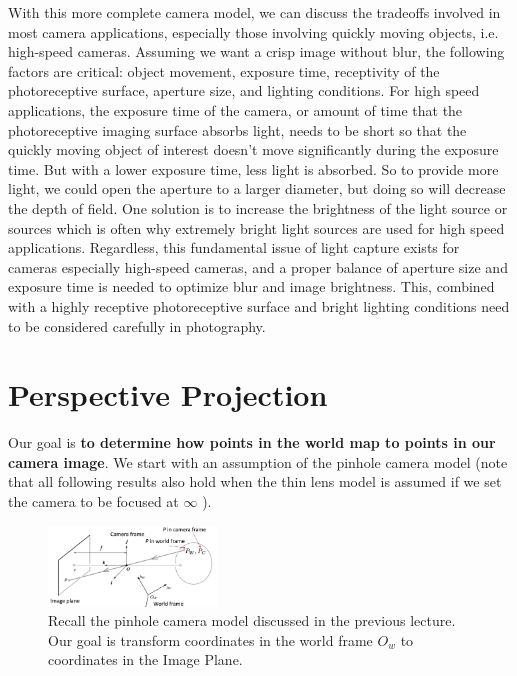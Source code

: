 \documentclass[]{article}
\begin{document}
	With this more complete camera model, we can discuss the tradeoffs involved in most camera applications, especially those involving quickly moving objects, i.e. high-speed cameras. Assuming we want a crisp image without blur, the following factors are critical: object movement, exposure time, receptivity of the photoreceptive surface, aperture size, and lighting conditions. For high speed applications, the exposure time of the camera, or amount of time that the photoreceptive imaging surface absorbs light, needs to be short so that the quickly moving object of interest doesn't move significantly during the exposure time. But with a lower exposure time, less light is absorbed. So to provide more light, we could open the aperture to a larger diameter, but doing so will decrease the depth of field. One solution is to increase the brightness of the light source or sources which is often why extremely bright light sources are used for high speed applications. Regardless, this fundamental issue of light capture exists for cameras especially high-speed cameras, and a proper balance of aperture size and exposure time is needed to optimize blur and image brightness. This, combined with a highly receptive photoreceptive surface and bright lighting conditions need to be considered carefully in photography.
	
	
	\section{Perspective Projection}
	Our goal is \textbf{to determine how points in the world map to points in our camera image}. We start with an assumption of the pinhole camera model (note that all following results also hold when the thin lens model is assumed if we set the camera to be focused at $\infty$ ).
	
	\begin{figure}[H]
		\includegraphics[width=0.4\textwidth]{diagram_1_vik.png}
		\centering
		\caption{Recall the pinhole camera model discussed in the previous lecture. Our goal is transform coordinates in the world frame $O_w$ to coordinates in the Image Plane. }
		\label{fig:pinhole_cam}
	\end{figure}
	
\end{document}
